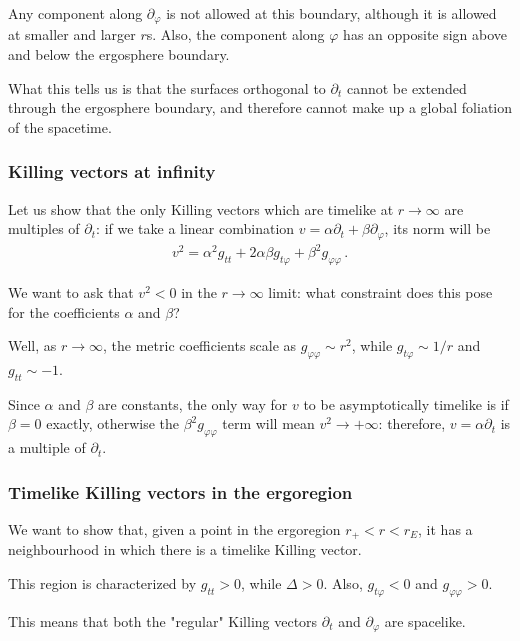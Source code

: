 \documentclass[main.tex]{subfiles}
\begin{document}
Any component along \(\partial_\varphi\) is not allowed at this boundary, although it is allowed at smaller and larger \(r\)s.
Also, the component along \(\varphi \) has an opposite sign above and below the ergosphere boundary. 

What this tells us is that the surfaces orthogonal to \(\partial_t\) cannot be extended through the ergosphere boundary, and therefore cannot make up a global foliation of the spacetime.

\subsubsection{Killing vectors at infinity}

Let us show that the only Killing vectors which are timelike at \(r \to \infty \) are multiples of \(\partial_t\): if we take a linear combination \(v = \alpha \partial_t + \beta \partial_\varphi\), its norm will be 
%
\begin{align}
v^2 = \alpha^2 g_{tt} + 2 \alpha \beta g_{t \varphi } + \beta^2 g_{\varphi \varphi }
\,.
\end{align}

We want to ask that \(v^2 < 0\) in the \(r \to \infty \) limit: what constraint does this pose for the coefficients \(\alpha \) and \(\beta \)? 

Well, as \(r \to \infty \), the metric coefficients scale as \(g_{\varphi \varphi } \sim r^2 \), while \(g_{t \varphi } \sim 1 /r\) and \(g_{tt} \sim -1\).

Since \(\alpha\) and \(\beta\) are constants, the only way for \(v\) to be asymptotically timelike is if \(\beta = 0\) exactly, otherwise the \(\beta^2 g_{\varphi \varphi }\) term will mean \(v^2 \to + \infty \): therefore, \(v = \alpha \partial_t\) is a multiple of \(\partial_t\). 

\subsubsection{Timelike Killing vectors in the ergoregion}

We want to show that, given a point in the ergoregion \(r_+ < r < r_E\), it has a neighbourhood in which there is a timelike Killing vector.

This region is characterized by \(g_{tt} > 0\), while \(\Delta > 0\).
Also, \(g_{t \varphi } < 0\) and \(g_{\varphi \varphi } > 0\). 

This means that both the "regular" Killing vectors \(\partial_t\) and \(\partial_\varphi \) are spacelike. 
\end{document}
